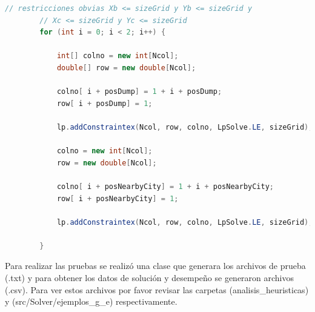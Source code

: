 \documentclass[10pt]{article}
\begin{document}
\begin{lstlisting}[language=Java]
// restricciones obvias Xb <= sizeGrid y Yb <= sizeGrid y
        // Xc <= sizeGrid y Yc <= sizeGrid
        for (int i = 0; i < 2; i++) {

            int[] colno = new int[Ncol];
            double[] row = new double[Ncol];

            colno[ i + posDump] = 1 + i + posDump;
            row[ i + posDump] = 1;

            lp.addConstraintex(Ncol, row, colno, LpSolve.LE, sizeGrid);

            colno = new int[Ncol];
            row = new double[Ncol];

            colno[ i + posNearbyCity] = 1 + i + posNearbyCity;
            row[ i + posNearbyCity] = 1;

            lp.addConstraintex(Ncol, row, colno, LpSolve.LE, sizeGrid); //Se anade la restriccion al modelo

        }
\end{lstlisting}

Para realizar las pruebas se realizó una clase que generara los archivos de prueba (.txt) y para obtener los datos de solución y desempeño se generaron archivos (.csv). Para ver estos
archivos por favor revisar las carpetas (analisis\_heuristicas) y (src/Solver/ejemplos\_g\_e) respectivamente.

\newpage
\end{document}
